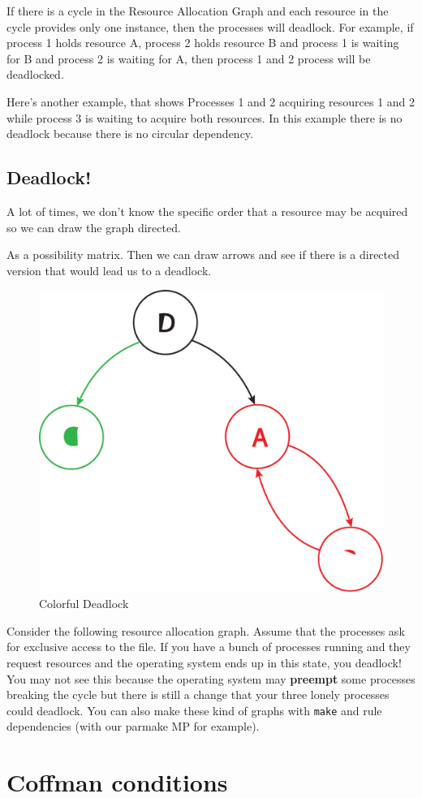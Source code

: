 If there is a cycle in the Resource Allocation Graph and each resource in the cycle provides only one instance, then the processes will deadlock. For example, if process 1 holds resource A, process 2 holds resource B and process 1 is waiting for B and process 2 is waiting for A, then process 1 and 2 process will be deadlocked.

Here's another example, that shows Processes 1 and 2 acquiring resources 1 and 2 while process 3 is waiting to acquire both resources. In this example there is no deadlock because there is no circular dependency.

\subsection{Deadlock!}

A lot of times, we don't know the specific order that a resource may be acquired so we can draw the graph directed.
 
\todo %

As a possibility matrix. Then we can draw arrows and see if there is a directed version that would lead us to a deadlock.

\todo %

\begin{figure}
  \begin{center}
\includegraphics[width=.25\textwidth]{deadlock/images/colorful.png}
\end{center}
  \caption{Colorful Deadlock}
\end{figure}

Consider the following resource allocation graph. Assume that the processes ask for exclusive access to the file. If you have a bunch of processes running and they request resources and the operating system ends up in this state, you deadlock! You may not see this because the operating system may \textbf{preempt} some processes breaking the cycle but there is still a change that your three lonely processes could deadlock. You can also make these kind of graphs with \texttt{make} and rule dependencies (with our parmake MP for example).

\section{Coffman conditions}

